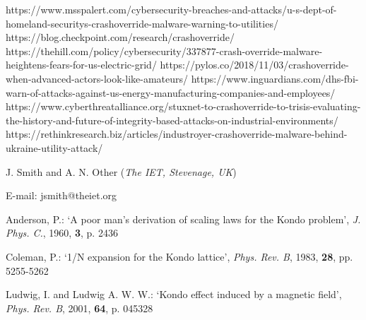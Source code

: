 \documentclass[11pt]{report}
\begin{document}
https://www.msspalert.com/cybersecurity-breaches-and-attacks/u-s-dept-of-homeland-securitys-crashoverride-malware-warning-to-utilities/
https://blog.checkpoint.com/research/crashoverride/
https://thehill.com/policy/cybersecurity/337877-crash-override-malware-heightens-fears-for-us-electric-grid/
https://pylos.co/2018/11/03/crashoverride-when-advanced-actors-look-like-amateurs/
https://www.inguardians.com/dhs-fbi-warn-of-attacks-against-us-energy-manufacturing-companies-and-employees/
https://www.cyberthreatalliance.org/stuxnet-to-crashoverride-to-trisis-evaluating-the-history-and-future-of-integrity-based-attacks-on-industrial-environments/
https://rethinkresearch.biz/articles/industroyer-crashoverride-malware-behind-ukraine-utility-attack/






\vskip3pt

\vskip5pt

\noindent J. Smith and A. N. Other (\textit{The IET, Stevenage, UK})
\vskip3pt

\noindent E-mail: jsmith@theiet.org

\begin{thebibliography}{}

Anderson, P.: `A poor man's derivation of scaling laws for the Kondo problem', \textit{J. Phys. C.}, 1960, \textbf{3}, p. 2436

Coleman, P.: `1/N expansion for the Kondo lattice', \textit{Phys. Rev. B}, 1983, \textbf{28}, pp. 5255-5262

Ludwig, I. and Ludwig A. W. W.: `Kondo effect induced by a magnetic field', \textit{Phys. Rev. B}, 2001, \textbf{64}, p. 045328

\end{thebibliography}
\end{document}
